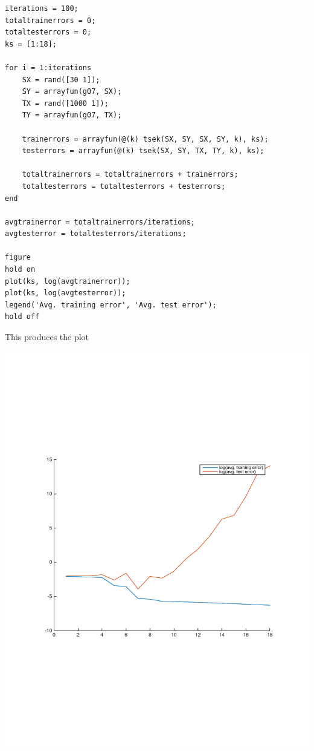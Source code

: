 \documentclass[11pt]{article}
\begin{document}
\begin{itemize}
        \begin{lstlisting}
iterations = 100;
totaltrainerrors = 0;
totaltesterrors = 0;
ks = [1:18];

for i = 1:iterations
    SX = rand([30 1]);
    SY = arrayfun(g07, SX);
    TX = rand([1000 1]);
    TY = arrayfun(g07, TX);
    
    trainerrors = arrayfun(@(k) tsek(SX, SY, SX, SY, k), ks);
    testerrors = arrayfun(@(k) tsek(SX, SY, TX, TY, k), ks);
    
    totaltrainerrors = totaltrainerrors + trainerrors;
    totaltesterrors = totaltesterrors + testerrors;
end

avgtrainerror = totaltrainerrors/iterations;
avgtesterror = totaltesterrors/iterations;

figure
hold on
plot(ks, log(avgtrainerror));
plot(ks, log(avgtesterror));
legend('Avg. training error', 'Avg. test error');
hold off
        \end{lstlisting}

        This produces the plot
        \begin{center}
        \includegraphics[width=\linewidth]{2e}
        \end{center}

\end{itemize}
\end{document}
